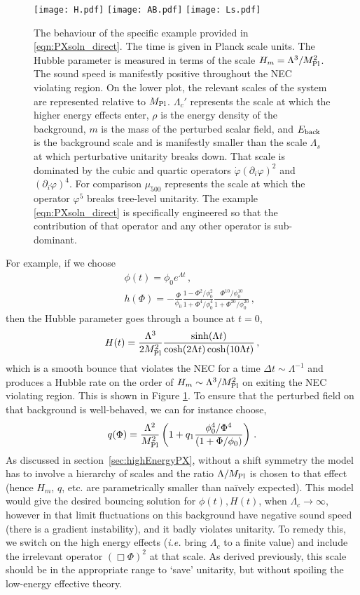 \documentclass[12pt]{article}
\def\ba{\begin{eqnarray}}
\def\ea{\end{eqnarray}}
\def\mpl{M_{\rm Pl}}
\def\({\left(}
\def\){\right)}
\def\ie{{\it i.e. }}
\def\p{\partial}
\def\p{\partial}
\begin{document}
\begin{figure}[h]\vspace{-2cm}
\centering
\texttt{[image: H.pdf]}
\texttt{[image: AB.pdf]}
\texttt{[image: Ls.pdf]}
\caption{The behaviour of the specific example provided in \eqref{eqn:PXsoln_direct}. The time is given in Planck scale units. The Hubble parameter is measured in terms of the scale $H_m=\Lambda^3/\mpl^2$.  The sound speed is manifestly positive throughout the NEC violating region. On the lower plot, the relevant scales of the system are represented relative to $\mpl$.
$\Lambda_c'$ represents the scale at which the higher energy effects enter, $\rho$ is the energy density of the background, $m$ is the mass of the perturbed scalar field, and $E_{\rm back}$ is the background scale and is manifestly smaller than the scale  $\Lambda_s$ at which perturbative unitarity breaks down. That scale is dominated by the cubic and quartic operators $\dot \varphi (\partial_i \varphi )^2$ and $(\p_i \varphi)^4$. For comparison $\mu_{500}$ represents the scale at which the operator $\varphi^5$ breaks tree-level unitarity. The example \eqref{eqn:PXsoln_direct} is specifically engineered so that the contribution of that operator and any other operator is sub-dominant.\vspace{-1cm}
 \label{fig:H}}
\end{figure}



For example, if we choose
\ba
&& \phi(t)=\phi_0 e^{\Lambda t} \, , \\
&&  h ( \Phi )= -  \frac{\Phi}{\phi_0} \frac{ 1 - \Phi^2/\phi_0^2 }{ 1 +\Phi^4/\phi_0^4 } \frac{ \Phi^{10}/\phi_0^{10} }{ 1 +\Phi^{20}/\phi_0^{20} }\,,
\label{eqn:h}
\ea
then the Hubble parameter goes through a bounce at $t=0$,
\ba
 H (t) = \frac{\Lambda^3}{2\mpl^2} \frac{\text{sinh} (\Lambda t) }{\text{cosh} (2 \Lambda t) \cosh(10 \Lambda t)} \, ,
\label{eqn:PXsoln_direct}
\ea
which is a smooth bounce that violates the NEC for a time $\Delta t \sim \Lambda^{-1}$ and produces a Hubble rate on the order of $H_m \sim \Lambda^{3} / \mpl^{2}$ on exiting the NEC violating region. This is shown in Figure \ref{fig:H}. To ensure that the perturbed field on that background is well-behaved, we can for instance choose,
\ba
q(\Phi)= \frac{\Lambda^2}{\mpl^2}  \(1+q_1 \frac{\phi_0^4/\Phi^4}{(1+\Phi/\phi_0 ) }  \)\,.
\ea
 As discussed in section~\ref{sec:highEnergyPX}, without a shift symmetry the model has to involve a hierarchy of scales and the ratio $\Lambda/\mpl$ is chosen to that effect (hence $H_m$, $q$, etc. are parametrically smaller than na\"{i}vely expected). This model would give the desired bouncing solution for $\phi (t), H(t)$, when  $\Lambda_c \to \infty$, however in that limit fluctuations on this background have negative sound speed (there is a gradient instability), and it badly violates unitarity. To remedy this, we switch on the high energy effects (\ie bring $\Lambda_c$ to a finite value) and include the irrelevant operator $(\Box \Phi)^2$ at that scale. As derived previously, this scale should be in the appropriate range to `save' unitarity, but without spoiling the low-energy effective theory.\\
\end{document}
